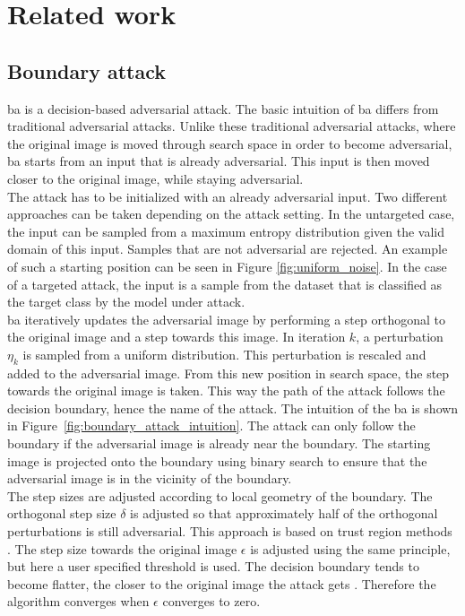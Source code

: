 \chapter{Related work}\label{chap:related_work}
\section{Boundary attack}
\gls{ba} \cite{boundary_attack} is a decision-based adversarial attack. The basic intuition of \gls{ba} differs from traditional adversarial attacks. Unlike these traditional adversarial attacks, where the original image is moved through search space in order to become adversarial, \gls{ba} starts from an input that is already adversarial. This input is then moved closer to the original image, while staying adversarial.\\

The attack has to be initialized with an already adversarial input. Two different approaches can be taken depending on the attack setting. In the untargeted case, the input can be sampled from a maximum entropy distribution given the valid domain of this input. Samples that are not adversarial are rejected. An example of such a starting position can be seen in Figure \ref{fig:uniform_noise}. In the case of a targeted attack, the input is a sample from the dataset that is classified as the target class by the model under attack.\\

\gls{ba} iteratively updates the adversarial image by performing a step orthogonal to the original image and a step towards this image. In iteration $k$, a perturbation $\eta_k$ is sampled from a uniform distribution. This perturbation is rescaled and added to the adversarial image. From this new position in search space, the step towards the original image is taken. This way the path of the attack follows the decision boundary, hence the name of the attack. The intuition of the \gls{ba} is shown in Figure~\ref{fig:boundary_attack_intuition}. The attack can only follow the boundary if the adversarial image is already near the boundary. The starting image is projected onto the boundary using binary search to ensure that the adversarial image is in the vicinity of the boundary.\\

The step sizes are adjusted according to local geometry of the boundary. The orthogonal step size $\delta$ is adjusted so that approximately half of the orthogonal perturbations is still adversarial. This approach is based on trust region methods \cite{trm}. The step size towards the original image $\epsilon$ is adjusted using the same principle, but here a user specified threshold is used. The decision boundary tends to become flatter, the closer to the original image the attack gets \cite{straight_boundaries}. Therefore the algorithm converges when $\epsilon$ converges to zero.\\

